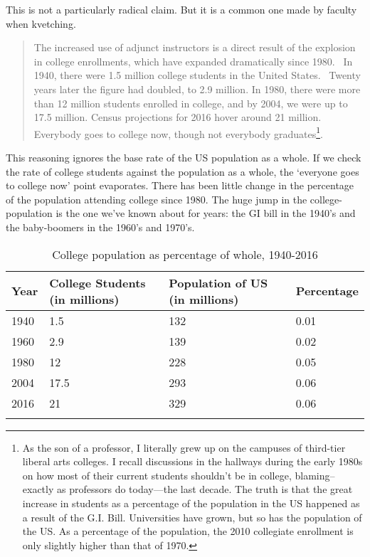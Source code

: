 This is not a particularly radical claim. But it is a common one made by faculty when kvetching. 

\begin{quote}

The increased use of adjunct instructors is a direct result of the explosion in college enrollments, which have expanded dramatically since 1980.  In 1940, there were 1.5 million college students in the United States.  Twenty years later the figure had doubled, to 2.9 million. In 1980, there were more than 12 million students enrolled in college, and by 2004, we were up to 17.5 million. Census projections for 2016 hover around 21 million. Everybody goes to college now, though not everybody graduates\footnote{As the son of a professor, I literally grew up on the campuses of third-tier liberal arts colleges. I recall discussions in the hallways during the early 1980s on how most of their current students shouldn't be in college, blaming--exactly as professors do today---the last decade. The truth is that the great increase in students as a percentage of the population in the US happened as a result of the G.I. Bill. Universities have grown, but so has the population of the US. As a percentage of the population, the 2010 collegiate enrollment is only slightly higher than that of 1970.}.
\end{quote}

This reasoning ignores the base rate of the US population as a whole. If we check the rate of college students against the population as a whole, the `everyone goes to college now' point evaporates. There has been little change in the percentage of the population attending college since 1980. The huge jump in the college-population is the one we've known about for years: the GI bill in the 1940's and the baby-boomers in the 1960's and 1970's.

 \begin{longtable}[!t]{ | p{1cm} | m{2cm} | m{2cm} |  m{2cm} | }
\hline 

Year&College Students (in millions)&Population of US (in millions) &Percentage \\ \hline
1940 & 1.5 & 132 & 0.01 \\ \hline
1960 & 2.9 & 139 & 0.02 \\ \hline
1980 & 12 & 228 & 0.05 \\ \hline 
2004 & 17.5 & 293 & 0.06 \\ \hline
2016 & 21 & 329 & 0.06 \\ \hline
\caption{College population as percentage of whole, 1940-2016}
\label{table: population}
\end{longtable}

